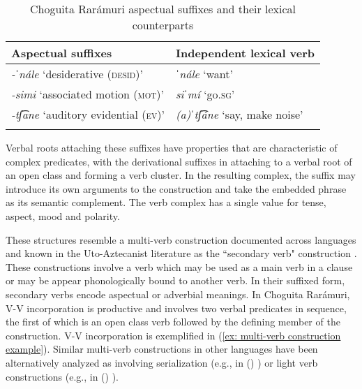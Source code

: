 \begin{table}
\caption{Choguita Rarámuri aspectual suffixes and their lexical counterparts}
\label{tab:15:aspectual-suffixes}

\begin{tabularx}{\textwidth}{Xl}
\lsptoprule

\textbf{Aspectual suffixes} & \textbf{Independent lexical verb}\\
\midrule
\textit{-ˈnále}	`desiderative (\textsc{desid})' & \textit{ˈnále} `want'\\
\textit{-simi} `associated motion (\textsc{mot})' & \textit{siˈmí} `go.\textsc{sg}'\\
\textit{-tʃ͡ane} `auditory evidential (\textsc{ev})' & \textit{(a)ˈtʃ͡áne} `say, make noise'\\
\lspbottomrule
\end{tabularx}
\end{table}

Verbal roots attaching these suffixes have properties that are characteristic of complex predicates, with the derivational suffixes in  attaching to a verbal root of an open class and forming a verb cluster. In the resulting complex, the suffix may introduce its own arguments to the construction and take the embedded phrase as its semantic complement. The verb complex has a single value for tense, aspect, mood and polarity.

These structures resemble a multi-verb construction documented across  languages and known in the Uto-Aztecanist literature as the ``secondary verb" construction \citep{crapo1970origins,thornes2011dimensions}. These constructions involve a verb which may be used as a main verb in a clause or may be appear phonologically bound to another verb. In their suffixed form, secondary verbs encode aspectual or adverbial meanings. In Choguita Rarámuri, V-V incorporation is productive and involves two verbal predicates in sequence, the first of which is an open class verb followed by the defining member of the construction. V-V incorporation is exemplified in (\ref{ex: multi-verb construction example}). Similar multi-verb constructions in other  languages have been alternatively analyzed as involving serialization (e.g., in  () \citep{thornes2011dimensions}) or light verb constructions (e.g., in  () \citep{tubino2014affixal}).

\ea\label{ex: multi-verb construction example}

